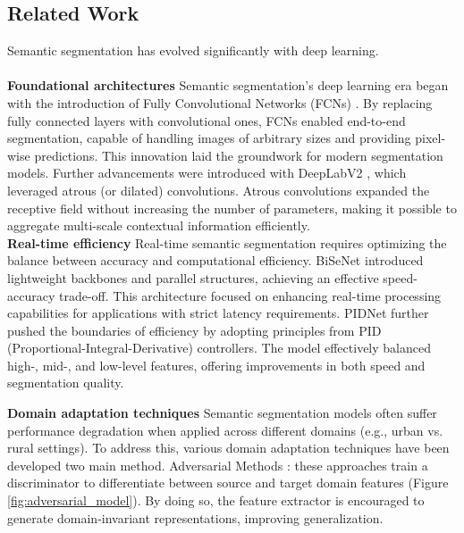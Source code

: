 \documentclass{article}
\begin{document}
	\begin{multicols}{2}


		\section{Related Work}
		Semantic segmentation has evolved significantly with deep learning. 
		\\
		\\
		\textbf{Foundational architectures}
		Semantic segmentation's deep learning era began with the introduction of Fully Convolutional Networks (FCNs) \cite{long2015fcn}. By replacing fully connected layers with convolutional ones, FCNs enabled end-to-end segmentation, capable of handling images of arbitrary sizes and providing pixel-wise predictions. This innovation laid the groundwork for modern segmentation models.
		Further advancements were introduced with DeepLabV2 \cite{chen2018deeplab}, which leveraged atrous (or dilated) convolutions. Atrous convolutions expanded the receptive field without increasing the number of parameters, making it possible to aggregate multi-scale contextual information efficiently.
		\\




		\textbf{Real-time efficiency}
		Real-time semantic segmentation requires optimizing the balance between accuracy and computational efficiency. BiSeNet \cite{yu2018bisenet} introduced lightweight backbones and parallel structures, achieving an effective speed-accuracy trade-off. This architecture focused on enhancing real-time processing capabilities for applications with strict latency requirements. PIDNet \cite{pidnet2023} further pushed the boundaries of efficiency by adopting principles from PID (Proportional-Integral-Derivative) controllers. The model effectively balanced high-, mid-, and low-level features, offering improvements in both speed and segmentation quality.
		
		\textbf{Domain adaptation techniques}
		Semantic segmentation models often suffer performance degradation when applied across different domains (e.g., urban vs. rural settings). To address this, various domain adaptation techniques have been developed two main method. Adversarial Methods \cite{tsai2018learning}: these approaches train a discriminator to differentiate between source and target domain features (Figure \ref{fig:adversarial_model}). By doing so, the feature extractor is encouraged to generate domain-invariant representations, improving generalization.


\end{multicols}
\end{document}
